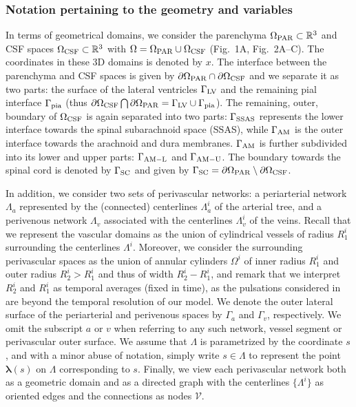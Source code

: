 \documentclass[fleqn,10pt]{wlscirep}
\begin{document}
\subsubsection{Notation pertaining to the geometry and variables}

In terms of geometrical domains, we consider the parenchyma
$\Omega_{\rm PAR} \subset \mathbb{R}^3$ and CSF spaces $\Omega_{\rm CSF}
\subset \mathbb{R}^3$ with $\Omega = \Omega_{\rm PAR} \cup \Omega_{\rm CSF}$
(Fig.~1A, Fig.~2A--C). The coordinates in these
3D domains is denoted by $x$. The interface between the parenchyma and
CSF spaces is given by $\partial \Omega_{\rm PAR} \cap \partial
\Omega_{\rm CSF}$ and we separate it as two parts: the surface of the
lateral ventricles $\Gamma_{\rm LV}$ and the remaining pial interface
$\Gamma_{\rm pia}$ (thus $\partial \Omega_{\rm CSF} \bigcap \partial
\Omega_{\rm PAR} = \Gamma_{\rm LV} \cup \Gamma_{\rm pia}$). The
remaining, outer, boundary of $\Omega_{\rm CSF}$ is again separated
into two parts: $\Gamma_{\rm SSAS}$ represents the lower interface
towards the spinal subarachnoid space (SSAS), while $\Gamma_{\rm AM}$
is the outer interface towards the arachnoid and dura
membranes. $\Gamma_{\rm AM}$ is further subdivided into its lower and
upper parts: $\Gamma_{\rm AM-L}$ and $\Gamma_{\rm AM-U}$. The boundary
towards the spinal cord is denoted by $\Gamma_{\rm{SC}}$ and given by
$\Gamma_{\rm{SC}} = \partial \Omega_{\rm PAR} \setminus \partial
\Omega_{\rm CSF}$.

In addition, we consider two sets of perivascular networks: a
periarterial network $\Lambda_a$ represented by the (connected)
centerlines $\Lambda^i_{a}$ of the arterial tree, and a perivenous
network $\Lambda_v$ associated with the centerlines $\Lambda^i_{v}$
of the veins. Recall that we represent the vascular domains as the
union of cylindrical vessels of radius $R_1^i$ surrounding the
centerlines $\Lambda^i$. Moreover, we consider the surrounding
perivascular spaces as the union of annular cylinders $\Omega^i$ of
inner radius $R_1^i$ and outer radius $R_2^i > R_1^i$ and thus of
width $R_2^i - R_1^i$, and remark that we interpret $R^i_2$ and $R^i_1$ as temporal averages (fixed in time), as the pulsations considered in  are beyond the temporal resolution of our model. We denote the outer lateral surface of the
periarterial and perivenous spaces by $\Gamma_a$ and $\Gamma_v$,
respectively. We omit the subscript $a$ or $v$ when referring to any
such network, vessel segment or perivascular outer surface. We assume
that $\Lambda$ is parametrized by the coordinate $s$, and with a minor
abuse of notation, simply write $s \in \Lambda$ to represent the point
${\bm \lambda}(s)$ on $\Lambda$ corresponding to $s$. Finally, we view
each perivascular network both as a geometric domain and as a directed
graph with the centerlines $\{ \Lambda^i \}$ as oriented edges and the
connections as nodes $\mathcal{V}$.
\end{document}

